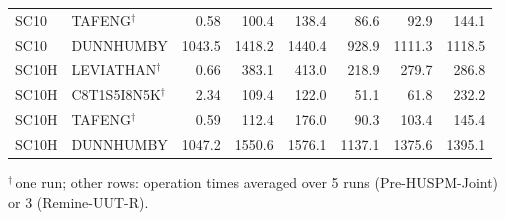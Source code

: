 \begin{table}[!htbp]
\begin{tabular*}{\textwidth}{@{\extracolsep\fill}llrrrrrr}
SC10 & TAFENG$^{\dagger}$ & 0.58 & 100.4 & 138.4 & 86.6 & 92.9 & 144.1 \\
SC10 & DUNNHUMBY & 1043.5 & 1418.2 & 1440.4 & 928.9 & 1111.3 & 1118.5 \\
SC10H & LEVIATHAN$^{\dagger}$ & 0.66 & 383.1 & 413.0 & 218.9 & 279.7 & 286.8 \\
SC10H & C8T1S5I8N5K$^{\dagger}$ & 2.34 & 109.4 & 122.0 & 51.1 & 61.8 & 232.2 \\
SC10H & TAFENG$^{\dagger}$ & 0.59 & 112.4 & 176.0 & 90.3 & 103.4 & 145.4 \\
SC10H & DUNNHUMBY & 1047.2 & 1550.6 & 1576.1 & 1137.1 & 1375.6 & 1395.1 \\
\bottomrule\end{tabular*}
\par\smallskip $^{\dagger}$\,one run; other rows: operation times averaged over 5 runs (\mbox{Pre-HUSPM-Joint}) or 3 (\mbox{Remine-UUT-R}).
\end{table}
